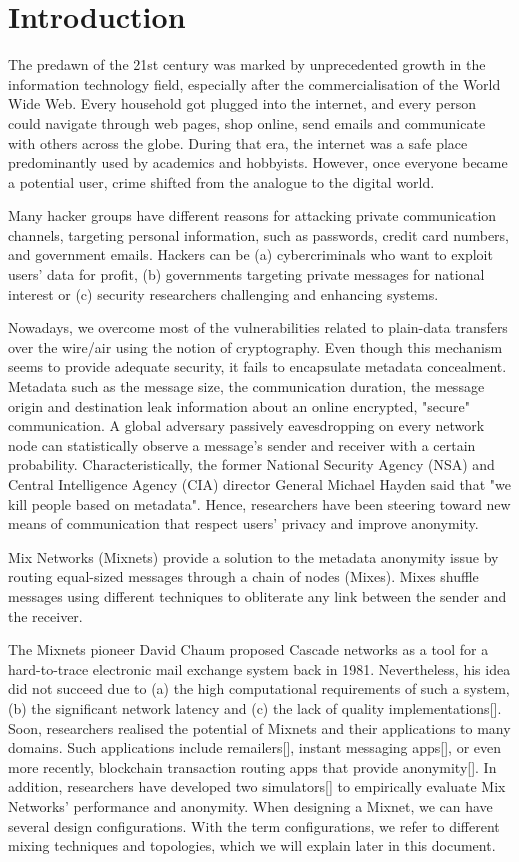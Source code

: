 \documentclass[logo,msc,cyber]{infthesis}   %
\begin{document}
\chapter{Introduction}

The predawn of the 21st century was marked by unprecedented growth in the
information technology field, especially after the commercialisation of the
World Wide Web. Every household got plugged into the internet, and every person
could navigate through web pages, shop online, send emails and communicate with
others across the globe. During that era, the internet was a safe place
predominantly used by academics and hobbyists. However, once everyone became a
potential user, crime shifted from the analogue to the digital world.

Many hacker groups have different reasons for attacking private communication
channels, targeting personal information, such as passwords, credit card
numbers, and government emails. Hackers can be (a) cybercriminals who want to
exploit users' data for profit, (b) governments targeting private messages for
national interest or (c) security researchers challenging and enhancing systems.


Nowadays, we overcome most of the vulnerabilities related to plain-data
transfers over the wire/air using the notion of cryptography. Even though this
mechanism seems to provide adequate security, it fails to encapsulate metadata
concealment. Metadata such as the message size, the communication duration, the
message origin and destination leak information about an online encrypted,
"secure" communication. A global adversary passively eavesdropping on every
network node can statistically observe a message's sender and receiver with a
certain probability. Characteristically, the former National Security Agency
(NSA) and Central Intelligence Agency (CIA) director General Michael Hayden said
that "we kill people based on metadata". Hence, researchers have been steering
toward new means of communication that respect users' privacy and improve
anonymity.

Mix Networks (Mixnets) provide a solution to the metadata anonymity issue by
routing equal-sized messages through a chain of nodes (Mixes). Mixes shuffle
messages using different techniques to obliterate any link between the sender
and the receiver. 

The Mixnets pioneer David Chaum proposed Cascade networks as a tool for a
hard-to-trace electronic mail exchange system back in 1981. Nevertheless, his
idea did not succeed due to (a) the high computational requirements of such a
system, (b) the significant network latency and (c) the lack of quality
implementations[]. Soon, researchers realised the potential of Mixnets and their
applications to many domains. Such applications include remailers[], instant
messaging apps[], or even more recently, blockchain transaction routing apps
that provide anonymity[]. In addition, researchers have developed two
simulators[] to empirically evaluate Mix Networks' performance and anonymity.
When designing a Mixnet, we can have several design configurations. With the
term configurations, we refer to different mixing techniques and topologies,
which we will explain later in this document.
\end{document}

